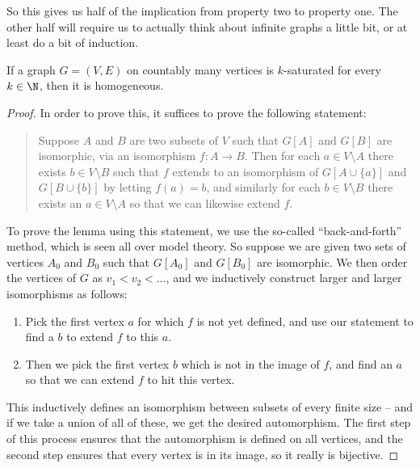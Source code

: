\documentclass[nobib]{tufte-handout}
\begin{document}
So this gives us half of the implication from property two to property one. The other half will require us to actually think about infinite graphs a little bit, or at least do a bit of induction.

\begin{lemma}\label{lemma:saturated_implies_homogeneous}
    If a graph $G = (V,E)$ on countably many vertices is $k$-saturated for every $k \in \N$, then it is homogeneous.
    
    \begin{proof}
        In order to prove this, it suffices to prove the following statement:
        \begin{quotation}
            Suppose $A$ and $B$ are two subsets of $V$ such that $G[A]$ and $G[B]$ are isomorphic, via an isomorphism $f: A \to B$. Then for each $a \in V \setminus A$ there exists $b \in V\setminus B$ such that $f$ extends to an isomorphism of $G[A \cup \{a\}]$ and $G[B \cup \{b\}]$ by letting $f(a) = b$, and similarly for each $b \in V \setminus B$ there exists an $a \in V \setminus A$ so that we can likewise extend $f$.
        \end{quotation}

        To prove the lemma using this statement, we use the so-called ``back-and-forth'' method, which is seen all over model theory. So suppose we are given two sets of vertices $A_0$ and $B_0$ such that $G[A_0]$ and $G[B_0]$ are isomorphic. We then order the vertices of $G$ as $v_1 < v_2 < \ldots$, and we inductively construct larger and larger isomorphisms as follows:
        \begin{enumerate}
            \item Pick the first vertex $a$ for which $f$ is not yet defined, and use our statement to find a $b$ to extend $f$ to this $a$.
            \item Then we pick the first vertex $b$ which is not in the image of $f$, and find an $a$ so that we can extend $f$ to hit this vertex.
        \end{enumerate}

        This inductively defines an isomorphism between subsets of every finite size -- and if we take a union of all of these, we get the desired automorphism. The first step of this process ensures that the automorphism is defined on all vertices, and the second step ensures that every vertex is in its image, so it really is bijective.


\end{proof}
\end{lemma}
\end{document}
